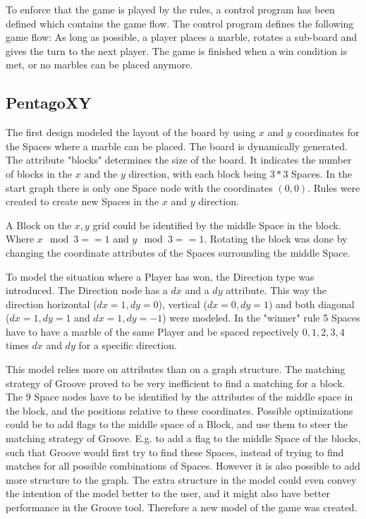 To enforce that the game is played by the rules, a control program has been defined which contains the game flow.
The control program defines the following game flow: As long as possible, a player places a marble, rotates a sub-board and gives the turn to the next player.
The game is finished when a win condition is met, or no marbles can be placed anymore.

\subsection{PentagoXY}
\label{pentagoxy}

The first design modeled the layout of the board by using $x$ and $y$ coordinates for the Spaces where a marble can be placed. 
The board is dynamically generated. The attribute "blocks" determines the size of the board. It indicates the number of blocks in the $x$ and the $y$ direction, with each block being $3*3$ Spaces.
In the start graph there is only one Space node with the coordinates $(0,0)$. Rules were created to create new Spaces in the $x$ and $y$ direction.

A Block on the $x,y$ grid could be identified by the middle Space in the block. Where $x\mod3==1$ and $y\mod3==1$.
Rotating the block was done by changing the coordinate attributes of the Spaces surrounding the middle Space.

\vspace{6pt}

To model the situation where a Player has won, the Direction type was introduced. The Direction node has a $dx$ and a $dy$ attribute.
This way the direction horizontal ($dx=1,dy=0$), vertical ($dx=0,dy=1$) and both diagonal ($dx=1,dy=1$ and $dx=1,dy=-1$) were modeled. 
In the "winner" rule 5 Spaces have to have a marble of the same Player and be spaced repectively $0,1,2,3,4$ times $dx$ and $dy$ for a specific direction.

\vspace{6pt}

This model relies more on attributes than on a graph structure.
The matching strategy of Groove proved to be very inefficient to find a matching for a block. The 9 Space nodes have to be identified by the attributes of the middle space in the block, and the positions relative to these coordinates.
Possible optimizations could be to add flags to the middle space of a Block, and use them to steer the matching strategy of Groove. E.g. to add a flag to the middle Space of the blocks, such that Groove would first try to find these Spaces, instead of trying to find matches for all possible combinations of Spaces.
However it is also possible to add more structure to the graph. 
The extra structure in the model could even convey the intention of the model better to the user, and it might also have better performance in the Groove tool. Therefore a new model of the game was created.

